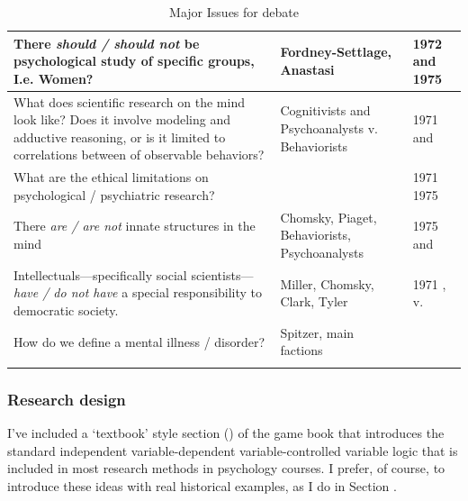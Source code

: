 \begin{refsection}
\begin{longtable}[!t]{ | P{4cm} | P{3cm} |  P{10cm} | }
There \emph{should / should not} be psychological study of specific groups, I.e. Women?&Fordney-Settlage, Anastasi&1972    and    
1975  \\ \hline
What does scientific research on the mind look like? Does it involve modeling and adductive reasoning, or is it limited to correlations between of observable behaviors?&Cognitivists and Psychoanalysts v. Behaviorists & 1971   and  \\ \hline
What are the ethical limitations on psychological / psychiatric research?&&  1971   
1975  \\ \hline
There \emph{are / are not} innate structures in the mind&Chomsky, Piaget, Behaviorists, Psychoanalysts&1975  and   \\ \hline
Intellectuals---specifically social scientists---\emph{have / do not have} a special responsibility to democratic society.&Miller, Chomsky, Clark, Tyler&1971   ,  v. \\ \hline
How do we define a mental illness / disorder?&Spitzer, main factions& \newline
{} \newline
{} \\ \hline
\caption{Major Issues for debate}
\label{table: majorissues}
\end{longtable}

\subsubsection{Research design}
\label{researchdesign}

I’ve included a ‘textbook’ style section () of the game book that introduces the standard independent variable-dependent variable-controlled variable logic that is included in most research methods in psychology courses. I prefer, of course, to introduce these ideas with real historical examples, as I do in Section .


\end{refsection}
